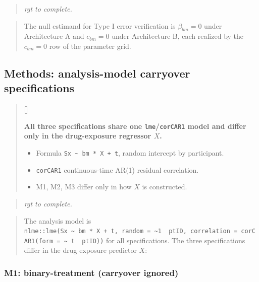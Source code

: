 \documentclass[
  11pt,
]{article}
\newcounter{pgraph}
\newenvironment{bullets}{%
  \stepcounter{pgraph}%
  \begin{quote}\small\sffamily\color[gray]{0.30}%
  {\normalfont\scriptsize\color[gray]{0.58}[\thepgraph]\enspace}}{%
  \end{quote}}
\newenvironment{rgt}{%
  \begin{quote}\small\itshape\color[RGB]{20,60,160}}{%
  \end{quote}}
\newenvironment{orig}{%
  \begin{quote}\normalsize\color[gray]{0.55}}{%
  \end{quote}}
\begin{document}
\begin{rgt}
rgt to complete.

\end{rgt}

\begin{orig}
The null estimand for Type I error verification is
\(\beta_{bm} = 0\) under Architecture A and \(c_{bm} = 0\) under
Architecture B, each realized by the \(c_{bm} = 0\) row of the
parameter grid.

\end{orig}

\subsection{Methods: analysis-model carryover specifications}\label{methods-analysis-model-carryover-specifications}

\begin{bullets}

\textbf{All three specifications share one \texttt{lme}/\texttt{corCAR1}
model and differ only in the drug-exposure regressor $X$.}

\begin{itemize}\setlength{\itemsep}{2pt}\setlength{\parskip}{0pt}
\item Formula \texttt{Sx \textasciitilde{} bm * X + t}, random
intercept by participant.
\item \texttt{corCAR1} continuous-time AR(1) residual correlation.
\item M1, M2, M3 differ only in how $X$ is constructed.
\end{itemize}

\end{bullets}

\begin{rgt}
rgt to complete.

\end{rgt}

\begin{orig}
The analysis model is \texttt{nlme::lme(Sx\ \textasciitilde{}\ bm\ *\ X\ +\ t,\ random\ =\ \textasciitilde{}1\ \textbar{}\ ptID,\ correlation\ =\ corCAR1(form\ =\ \textasciitilde{}\ t\ \textbar{}\ ptID))} for all
specifications. The three specifications differ in the drug
exposure predictor \(X\):

\end{orig}

\subsubsection{M1: binary-treatment (carryover ignored)}\label{m1-binary-treatment-carryover-ignored}
\end{document}
